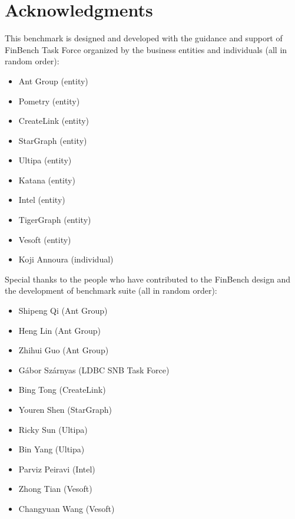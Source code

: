 \chapter*{Acknowledgments}

\renewcommand{\labelitemii}{\textbullet}

This benchmark is designed and developed with the guidance and support of
FinBench Task Force organized by the business entities and individuals (all
in random order):
\begin{itemize}
  \item Ant Group (entity)
  \item Pometry (entity)
  \item CreateLink (entity)
  \item StarGraph (entity)
  \item Ultipa (entity)
  \item Katana (entity)
  \item Intel (entity)
  \item TigerGraph (entity)
  \item Vesoft (entity)
  \item Koji Annoura (individual)
\end{itemize}

Special thanks to the people who have contributed to the FinBench design and the development
of benchmark suite (all in random order):

\begin{itemize}
  \item Shipeng Qi (Ant Group)
  \item Heng Lin (Ant Group)
  \item Zhihui Guo (Ant Group)
  \item Gábor Szárnyas (LDBC SNB Task Force)
  \item Bing Tong (CreateLink)
  \item Youren Shen (StarGraph)
  \item Ricky Sun (Ultipa)
  \item Bin Yang (Ultipa)
  \item Parviz Peiravi (Intel)
  \item Zhong Tian (Vesoft)
  \item Changyuan Wang (Vesoft)
\end{itemize}